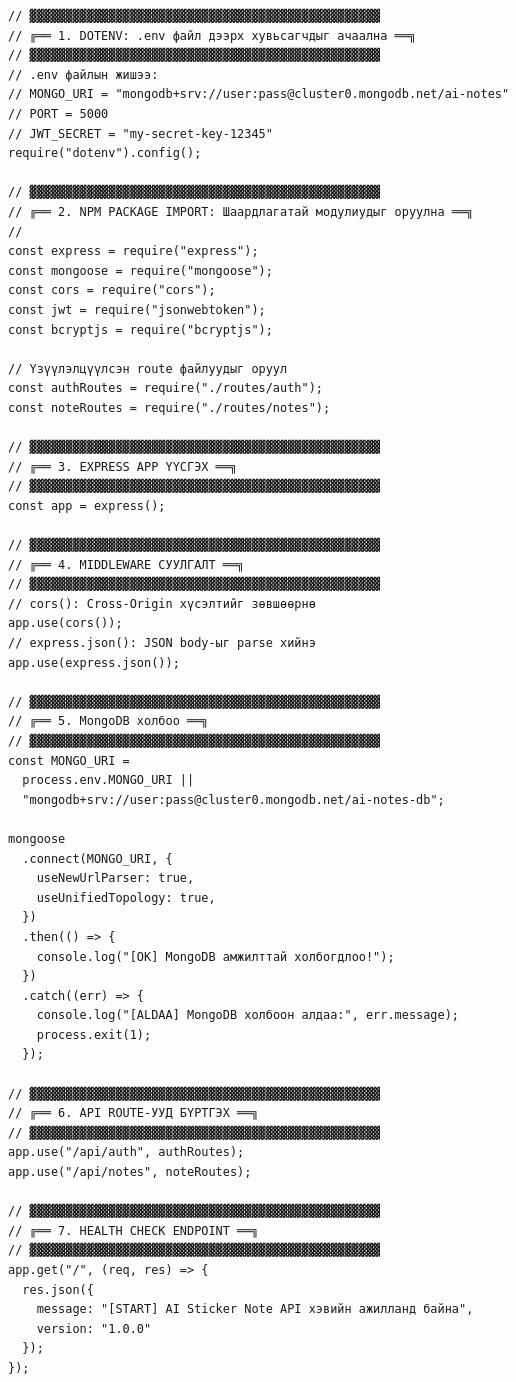 \begin{lstlisting}[caption={server.js -- Express серверийн бүрэн тохиргоо}]
// ▓▓▓▓▓▓▓▓▓▓▓▓▓▓▓▓▓▓▓▓▓▓▓▓▓▓▓▓▓▓▓▓▓▓▓▓▓▓▓▓▓▓▓▓▓▓▓▓▓
// ╔══ 1. DOTENV: .env файл дээрх хувьсагчдыг ачаална ══╗
// ▓▓▓▓▓▓▓▓▓▓▓▓▓▓▓▓▓▓▓▓▓▓▓▓▓▓▓▓▓▓▓▓▓▓▓▓▓▓▓▓▓▓▓▓▓▓▓▓▓
// .env файлын жишээ:
// MONGO_URI = "mongodb+srv://user:pass@cluster0.mongodb.net/ai-notes"
// PORT = 5000
// JWT_SECRET = "my-secret-key-12345"
require("dotenv").config();

// ▓▓▓▓▓▓▓▓▓▓▓▓▓▓▓▓▓▓▓▓▓▓▓▓▓▓▓▓▓▓▓▓▓▓▓▓▓▓▓▓▓▓▓▓▓▓▓▓▓
// ╔══ 2. NPM PACKAGE IMPORT: Шаардлагатай модулиудыг оруулна ══╗
// 
const express = require("express");
const mongoose = require("mongoose");
const cors = require("cors");
const jwt = require("jsonwebtoken");
const bcryptjs = require("bcryptjs");

// Үзүүлэлцүүлсэн route файлуудыг оруул
const authRoutes = require("./routes/auth");
const noteRoutes = require("./routes/notes");

// ▓▓▓▓▓▓▓▓▓▓▓▓▓▓▓▓▓▓▓▓▓▓▓▓▓▓▓▓▓▓▓▓▓▓▓▓▓▓▓▓▓▓▓▓▓▓▓▓▓
// ╔══ 3. EXPRESS APP ҮҮСГЭХ ══╗
// ▓▓▓▓▓▓▓▓▓▓▓▓▓▓▓▓▓▓▓▓▓▓▓▓▓▓▓▓▓▓▓▓▓▓▓▓▓▓▓▓▓▓▓▓▓▓▓▓▓
const app = express();

// ▓▓▓▓▓▓▓▓▓▓▓▓▓▓▓▓▓▓▓▓▓▓▓▓▓▓▓▓▓▓▓▓▓▓▓▓▓▓▓▓▓▓▓▓▓▓▓▓▓
// ╔══ 4. MIDDLEWARE СУУЛГАЛТ ══╗
// ▓▓▓▓▓▓▓▓▓▓▓▓▓▓▓▓▓▓▓▓▓▓▓▓▓▓▓▓▓▓▓▓▓▓▓▓▓▓▓▓▓▓▓▓▓▓▓▓▓
// cors(): Cross-Origin хүсэлтийг зөвшөөрнө
app.use(cors());
// express.json(): JSON body-ыг parse хийнэ
app.use(express.json());

// ▓▓▓▓▓▓▓▓▓▓▓▓▓▓▓▓▓▓▓▓▓▓▓▓▓▓▓▓▓▓▓▓▓▓▓▓▓▓▓▓▓▓▓▓▓▓▓▓▓
// ╔══ 5. MongoDB холбоо ══╗
// ▓▓▓▓▓▓▓▓▓▓▓▓▓▓▓▓▓▓▓▓▓▓▓▓▓▓▓▓▓▓▓▓▓▓▓▓▓▓▓▓▓▓▓▓▓▓▓▓▓
const MONGO_URI = 
  process.env.MONGO_URI || 
  "mongodb+srv://user:pass@cluster0.mongodb.net/ai-notes-db";

mongoose
  .connect(MONGO_URI, {
    useNewUrlParser: true,
    useUnifiedTopology: true,
  })
  .then(() => {
    console.log("[OK] MongoDB амжилттай холбогдлоо!");
  })
  .catch((err) => {
    console.log("[ALDAA] MongoDB холбоон алдаа:", err.message);
    process.exit(1);
  });

// ▓▓▓▓▓▓▓▓▓▓▓▓▓▓▓▓▓▓▓▓▓▓▓▓▓▓▓▓▓▓▓▓▓▓▓▓▓▓▓▓▓▓▓▓▓▓▓▓▓
// ╔══ 6. API ROUTE-УУД БҮРТГЭХ ══╗
// ▓▓▓▓▓▓▓▓▓▓▓▓▓▓▓▓▓▓▓▓▓▓▓▓▓▓▓▓▓▓▓▓▓▓▓▓▓▓▓▓▓▓▓▓▓▓▓▓▓
app.use("/api/auth", authRoutes);
app.use("/api/notes", noteRoutes);

// ▓▓▓▓▓▓▓▓▓▓▓▓▓▓▓▓▓▓▓▓▓▓▓▓▓▓▓▓▓▓▓▓▓▓▓▓▓▓▓▓▓▓▓▓▓▓▓▓▓
// ╔══ 7. HEALTH CHECK ENDPOINT ══╗
// ▓▓▓▓▓▓▓▓▓▓▓▓▓▓▓▓▓▓▓▓▓▓▓▓▓▓▓▓▓▓▓▓▓▓▓▓▓▓▓▓▓▓▓▓▓▓▓▓▓
app.get("/", (req, res) => {
  res.json({
    message: "[START] AI Sticker Note API хэвийн ажилланд байна",
    version: "1.0.0"
  });
});


\end{lstlisting}
